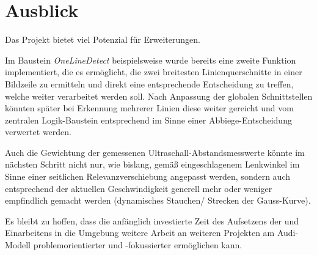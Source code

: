 \documentclass[12pt, a4paper]{scrartcl}
\begin{document}
\section{Ausblick}
Das Projekt bietet viel Potenzial für Erweiterungen.

Im Baustein \emph{OneLineDetect} beispielsweise wurde bereits eine zweite Funktion implementiert, die es ermöglicht, die zwei breitesten Linienquerschnitte in einer Bildzeile zu ermitteln und direkt eine entsprechende Entscheidung zu treffen, welche weiter verarbeitet werden soll. Nach Anpassung der globalen Schnittstellen könnten später bei Erkennung mehrerer Linien diese weiter gereicht und vom zentralen Logik-Baustein entsprechend im Sinne einer Abbiege-Entscheidung verwertet werden.

Auch die Gewichtung der gemessenen Ultraschall-Abstandsmesswerte könnte im nächsten Schritt nicht nur, wie bislang, gemäß eingeschlagenem Lenkwinkel im Sinne einer seitlichen Relevanzverschiebung angepasst werden, sondern auch entsprechend der aktuellen Geschwindigkeit generell mehr oder weniger empfindlich gemacht werden (dynamisches Stauchen/ Strecken der Gauss-Kurve).

Es bleibt zu hoffen, dass die anfänglich investierte Zeit des Aufsetzens der und Einarbeitens in die Umgebung weitere Arbeit an weiteren Projekten am Audi-Modell problemorientierter und -fokussierter ermöglichen kann.


\newpage
{}
\listoffigures
\end{document}

